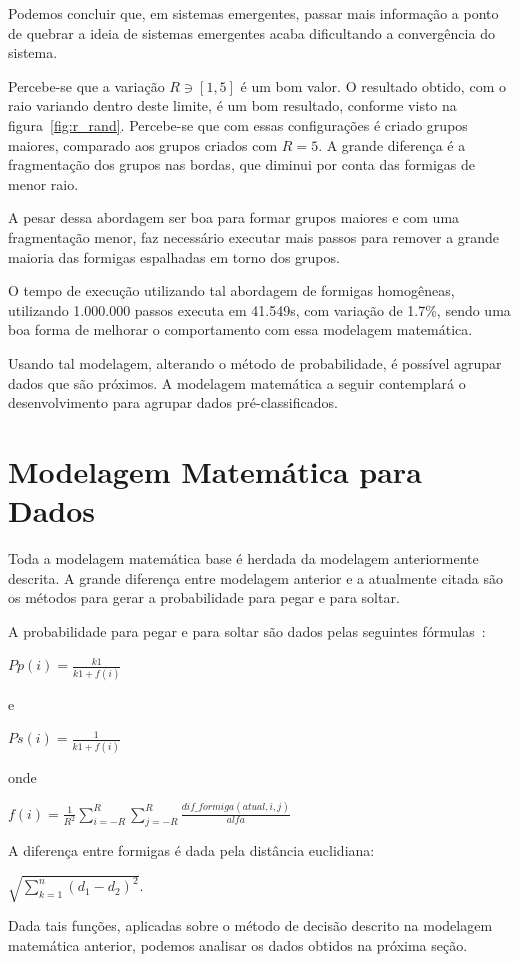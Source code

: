 \documentclass[conference]{IEEEtran}
\begin{document}
Podemos concluir que, em sistemas emergentes, passar mais informação a ponto de quebrar a ideia de sistemas emergentes acaba dificultando a convergência do sistema.

Percebe-se que a variação $R\ni[1,5]$ é um bom valor. O resultado obtido, com o raio variando dentro deste limite, é um bom resultado, conforme visto na figura~\ref{fig:r_rand}. Percebe-se que com essas configurações é criado grupos maiores, comparado aos grupos criados com $R=5$. A grande diferença é a fragmentação dos grupos nas bordas, que diminui por conta das formigas de menor raio.

A pesar dessa abordagem ser boa para formar grupos maiores e com uma fragmentação menor, faz necessário executar mais passos para remover a grande maioria das formigas espalhadas em torno dos grupos.

O tempo de execução utilizando tal abordagem de formigas homogêneas, utilizando 1.000.000 passos executa em 41.549s, com variação de 1.7\%, sendo uma boa forma de melhorar o comportamento com essa modelagem matemática.

Usando tal modelagem, alterando o método de probabilidade, é possível agrupar dados que são próximos. A modelagem matemática a seguir contemplará o desenvolvimento para agrupar dados pré-classificados.

\section{Modelagem Matemática para Dados}

Toda a modelagem matemática base é herdada da modelagem anteriormente descrita. A grande diferença entre modelagem anterior e a atualmente citada são os métodos para gerar a probabilidade para pegar e para soltar.

A probabilidade para pegar e para soltar são dados pelas seguintes fórmulas~\cite{b2}:

$Pp(i) = \frac{k1}{k1 + f(i)}$

e

$Ps(i) = \frac{1}{k1 + f(i)}$

onde

$f(i) =  \frac{1}{R^2}\sum_{i=-R}^{R}\sum_{j=-R}^{R}\frac{dif\_formiga(atual, i, j)}{alfa}$

A diferença entre formigas é dada pela distância euclidiana:

$\sqrt{\sum_{k=1}^{n}(d_1 - d_2)^2}$.

Dada tais funções, aplicadas sobre o método de decisão descrito na modelagem matemática anterior, podemos analisar os dados obtidos na próxima seção.
\end{document}
